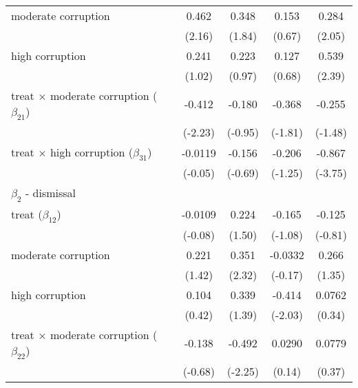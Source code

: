 {\begin{tabular}{l*{4}{c}}
moderate corruption        &       0.462\sym{*}  &       0.348         &       0.153         &       0.284\sym{*}  \\
                    &      (2.16)         &      (1.84)         &      (0.67)         &      (2.05)         \\
high corruption        &       0.241         &       0.223         &       0.127         &       0.539\sym{*}  \\
                    &      (1.02)         &      (0.97)         &      (0.68)         &      (2.39)         \\
treat $\times$ moderate corruption ($\beta_{21}$)&      -0.412\sym{*}  &      -0.180         &      -0.368         &      -0.255         \\
                    &     (-2.23)         &     (-0.95)         &     (-1.81)         &     (-1.48)         \\
treat $\times$ high corruption ($\beta_{31}$)&     -0.0119         &      -0.156         &      -0.206         &      -0.867\sym{***}\\
                    &     (-0.05)         &     (-0.69)         &     (-1.25)         &     (-3.75)         \\
\midrule
$\beta_2$ - dismissal&                     &                     &                     &                     \\
\addlinespace
treat ($\beta_{12}$)             &     -0.0109         &       0.224         &      -0.165         &      -0.125         \\
                    &     (-0.08)         &      (1.50)         &     (-1.08)         &     (-0.81)         \\
moderate corruption        &       0.221         &       0.351\sym{*}  &     -0.0332         &       0.266         \\
                    &      (1.42)         &      (2.32)         &     (-0.17)         &      (1.35)         \\
high corruption        &       0.104         &       0.339         &      -0.414\sym{*}  &      0.0762         \\
                    &      (0.42)         &      (1.39)         &     (-2.03)         &      (0.34)         \\
treat $\times$ moderate corruption ($\beta_{22}$)&      -0.138         &      -0.492\sym{*}  &      0.0290         &      0.0779         \\
                    &     (-0.68)         &     (-2.25)         &      (0.14)         &      (0.37)         \\

\end{tabular}}
